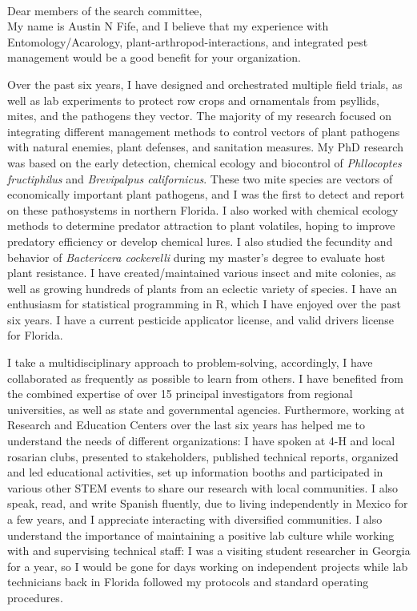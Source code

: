 \documentclass[11pt]{letter} %
\begin{document}
\begin{letter}
\\
Dear members of the search committee,\\

My name is Austin N Fife, and I believe that my experience with Entomology/Acarology, plant-arthropod-interactions, and integrated pest management would be a good benefit for your organization.

Over the past six years, I have designed and orchestrated multiple field trials, as well as lab experiments to protect row crops and ornamentals from psyllids, mites, and the pathogens they vector. The majority of my research focused on integrating different management methods to control vectors of plant pathogens with natural enemies, plant defenses, and sanitation measures. My PhD research was based on the early detection, chemical ecology and biocontrol of \textit{Phllocoptes fructiphilus} and \textit{Brevipalpus californicus}. These two mite species are vectors of economically important plant pathogens, and I was the first to detect and report on these pathosystems in northern Florida. I also worked with chemical ecology methods to determine predator attraction to plant volatiles, hoping to improve predatory efficiency or develop chemical lures. I also studied the fecundity and behavior of \textit{Bactericera cockerelli} during my master's degree to evaluate host plant resistance. I have created/maintained various insect and mite colonies, as well as growing hundreds of plants from an eclectic variety of species. I have an enthusiasm for statistical programming in R, which I have enjoyed over the past six years. I have a current pesticide applicator license, and valid drivers license for Florida.

I take a multidisciplinary approach to problem-solving, accordingly, I have collaborated as frequently as possible to learn from others. I have benefited from the combined expertise of over 15 principal investigators from regional universities, as well as state and governmental agencies. Furthermore, working at Research and Education Centers over the last six years has helped me to understand the needs of different organizations: I have spoken at 4-H and local rosarian clubs, presented to stakeholders, published technical reports, organized and led educational activities, set up information booths and participated in various other STEM events to share our research with local communities. I also speak, read, and write Spanish fluently, due to living independently in Mexico for a few years, and I appreciate interacting with diversified communities. I also understand the importance of maintaining a positive lab culture while working with and supervising technical staff: I was a visiting student researcher in Georgia for a year, so I would be gone for days working on independent projects while lab technicians back in Florida followed my protocols and standard operating procedures.


\end{letter}
\end{document}
